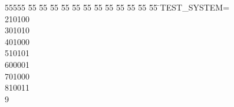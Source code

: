 %
%
\begin{tabbing}
55555 \= 55 \= 55 \= 55 \= 55 \= 55 \= 55 \= 55 \= 55 \= 55 \= 55 \= 55 \= 55 \= \>TEST\_SYSTEM=\\[0pt]
210100\ \\[0pt]
301010\ \\[0pt]
401000\ \\[0pt]
510101\ \\[0pt]
600001\ \\[0pt]
701000\ \\[0pt]
810011\\[0pt]
9\>\end{tabbing}
